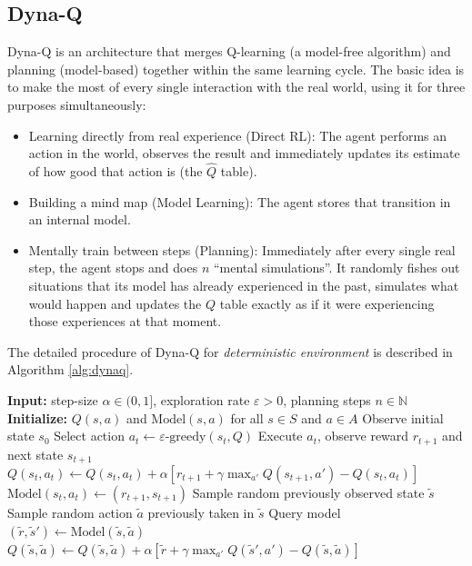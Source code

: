 \documentclass[10pt, a4paper]{report}
\begin{document}
\subsection{Dyna-Q}
Dyna-Q is an architecture that merges Q-learning (a model-free algorithm) and planning (model-based) together within the same learning cycle. 
The basic idea is to make the most of every single interaction with the real world, using it for three purposes simultaneously:\begin{itemize}
    \item Learning directly from real experience (Direct RL): The agent performs an action in the world, observes the result and immediately updates its estimate of how good that action is (the $\hat Q$ table).
    \item Building a mind map (Model Learning): The agent stores that transition in an internal model.
    \item Mentally train between steps (Planning): Immediately after every single real step, the agent stops and does $n$ ``mental simulations''. It randomly fishes out situations that its model has already experienced in the past, simulates what would happen and updates the $Q$ table exactly as if it were experiencing those experiences at that moment.
\end{itemize}
\noindent The detailed procedure of Dyna-Q for \textit{deterministic environment} is described in Algorithm \ref{alg:dynaq}.
\begin{algorithm}[H]
\caption{Dyna-Q}\label{alg:dynaq}
\begin{algorithmic}[1]
    \State \textbf{Input:} step-size $\alpha \in (0, 1]$, exploration rate $\varepsilon > 0$, planning steps $n \in \mathbb{N}$
    \State \textbf{Initialize:} $Q(s, a)$ and $\text{Model}(s, a)$ for all $s \in S$ and $a \in A$
        \State Observe initial state $s_0$
            \State Select action $a_t \leftarrow \varepsilon\text{-greedy}(s_t, Q)$
            \State Execute $a_t$, observe reward $r_{t+1}$ and next state $s_{t+1}$
            \State $Q(s_t, a_t) \leftarrow Q(s_t, a_t) + \alpha \left[ r_{t+1} + \gamma \max_{a'} Q(s_{t+1}, a') - Q(s_t, a_t) \right]$
            \State $\text{Model}(s_t, a_t) \leftarrow (r_{t+1}, s_{t+1})$ \quad{}
            \quad{}
                \State Sample random previously observed state $\tilde{s}$
                \State Sample random action $\tilde{a}$ previously taken in $\tilde{s}$
                \State Query model $(\tilde{r}, \tilde{s}') \leftarrow \text{Model}(\tilde{s}, \tilde{a})$
                \State $Q(\tilde{s}, \tilde{a}) \leftarrow Q(\tilde{s}, \tilde{a}) + \alpha \left[ \tilde{r} + \gamma \max_{a'} Q(\tilde{s}', a') - Q(\tilde{s}, \tilde{a}) \right]$
            \EndFor
        \EndFor
    \EndFor
\end{algorithmic}
\end{algorithm}
\end{document}
